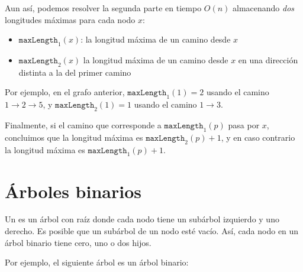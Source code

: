 Aun así, podemos resolver la segunda parte en
tiempo $O(n)$ almacenando \emph{dos} longitudes máximas
para cada nodo $x$:
\begin{itemize}
\item $\texttt{maxLength}_1(x)$:
la longitud máxima de un camino desde $x$
\item $\texttt{maxLength}_2(x)$
la longitud máxima de un camino desde $x$
en una dirección distinta a la del primer camino
\end{itemize}
Por ejemplo, en el grafo anterior,
$\texttt{maxLength}_1(1)=2$
usando el camino $1 \rightarrow 2 \rightarrow 5$,
y $\texttt{maxLength}_2(1)=1$
usando el camino $1 \rightarrow 3$.

Finalmente, si el camino que corresponde a
$\texttt{maxLength}_1(p)$ pasa por $x$,
concluimos que la longitud máxima es
$\texttt{maxLength}_2(p)+1$,
y en caso contrario la longitud máxima es
$\texttt{maxLength}_1(p)+1$.


\section{Árboles binarios}


\begin{samepage}
Un  es un árbol con raíz
donde cada nodo tiene un subárbol izquierdo y uno derecho.
Es posible que un subárbol de un nodo esté vacío.
Así, cada nodo en un árbol binario tiene
cero, uno o dos hijos.

Por ejemplo, el siguiente árbol es un árbol binario:
\begin{center}
\end{center}
\end{samepage}


